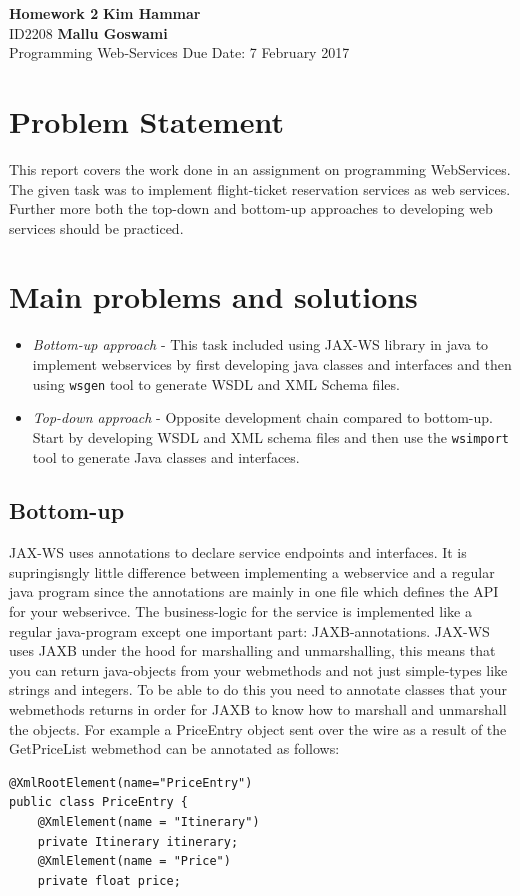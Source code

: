 \documentclass[a4paper, 11pt]{article}
\begin{document}
\noindent
\large\textbf{Homework 2} \hfill \textbf{Kim Hammar} \\
\normalsize ID2208 \hfill  \textbf{Mallu Goswami} \\
Programming Web-Services \hfill Due Date: 7 February 2017\\

\section*{Problem Statement}
This report covers the work done in an assignment on programming WebServices. The given task was to implement flight-ticket reservation services as web services. Further more both the top-down and bottom-up approaches to developing web services should be practiced.
\section*{Main problems and solutions}
\begin{itemize}
\item \textit{Bottom-up approach} - This task included using JAX-WS library \citep{jax_ws} in java to implement webservices by first developing java classes and interfaces and then using \texttt{wsgen} tool to generate WSDL and XML Schema files.
\item \textit{Top-down approach} - Opposite development chain compared to bottom-up. Start by developing WSDL and XML schema files and then use the \texttt{wsimport} tool to generate Java classes and interfaces.  
\end{itemize}

\subsection*{Bottom-up}
JAX-WS uses annotations to declare service endpoints and interfaces. It is supringisngly little difference between implementing a webservice and a regular java program since the annotations are mainly in one file which defines the API for your webserivce. The business-logic for the service is implemented like a regular java-program except one important part: JAXB-annotations. JAX-WS uses JAXB under the hood for marshalling and unmarshalling, this means that you can return java-objects from your webmethods and not just simple-types like strings and integers. To be able to do this you need to annotate classes that your webmethods returns in order for JAXB to  know how to marshall and unmarshall the objects. For example a PriceEntry object sent over the wire as a result of the GetPriceList webmethod can be annotated as follows:
\begin{lstlisting}[frame=single,style=java]
@XmlRootElement(name="PriceEntry")
public class PriceEntry {
    @XmlElement(name = "Itinerary")
    private Itinerary itinerary;
    @XmlElement(name = "Price")
    private float price;
  \end{lstlisting}
\end{document}
